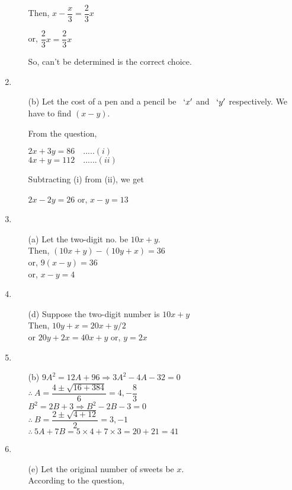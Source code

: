 \begin{multicols}{2}
\begin{enumerate}
\begin{itemize}
    Then, $x - \dfrac{x}{3} = \dfrac{2}{3}x$

    or, $\dfrac{2}{3}x = \dfrac{2}{3}x$

    So, can't be determined is the correct choice.
  \end{itemize}
\item
  \begin{itemize}
  \item[(b)] Let the cost of a pen and a pencil be \rupee~$`x'$ and \rupee~$`y'$ respectively. We have to find $(x - y).$

    From the question,

    $2x + 3y = 86 \quad..... (i)$\\
    $4x + y = 112 \quad...... (ii)$

    Subtracting (i) from (ii), we get

    $2x - 2y = 26$ or, $x - y = 13$
  \end{itemize}
\item
  \begin{itemize}
  \item[(a)] Let the two-digit no. be $10x + y$.\\
    Then, $(10x + y) - (10y + x) = 36$\\
    or, $9(x - y) = 36$\\
    or, $x - y = 4$
  \end{itemize}
\item
  \begin{itemize}
  \item[(d)] Suppose the two-digit number is $10x + y$\\
    Then, $10y + x = 20x + y/2$\\
    or $20y + 2x = 40x + y$ or, $y = 2x$
  \end{itemize}
\item
  \begin{itemize}
  \item[(b)] $9A^2 = 12A + 96 \Rightarrow 3A^2 - 4A - 32 = 0$\\[0.1cm]
    $\therefore~ A = \dfrac{4\pm \sqrt{16 + 384}}{6} = 4, -\dfrac{8}{3}$\\[0.1cm]
    $B^2 = 2B + 3 \Rightarrow B^2 - 2B - 3 = 0$\\[0.1cm]
    $\therefore~ B = \dfrac{2 \pm \sqrt{4 + 12}}{2} = 3, -1$\\[0.1cm]
    $\therefore~ 5A + 7B = 5 \times 4 + 7 \times 3 = 20 + 21 = 41$
  \end{itemize}
\item
  \begin{itemize}
  \item[(e)] Let the original number of sweets be $x$.\\
    According to the question,


\end{itemize}
\end{enumerate}
\end{multicols}
